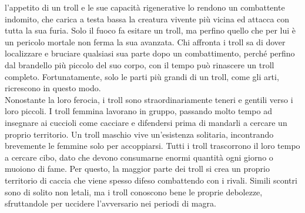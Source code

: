 \begin{multicols}{2}
l'appetito di un troll e le sue capacità rigenerative lo rendono un combattente indomito, che carica a testa bassa la creatura vivente più vicina ed attacca con tutta la sua furia. Solo il fuoco fa esitare un troll, ma perfino quello che per lui è un pericolo mortale non ferma la sua avanzata. Chi affronta i troll sa di dover localizzare e bruciare qualsiasi sua parte dopo un combattimento, perché perfino dal brandello più piccolo del suo corpo, con il tempo può rinascere un troll completo. Fortunatamente, solo le parti più grandi di un troll, come gli arti, ricrescono in questo modo.\\

Nonostante la loro ferocia, i troll sono straordinariamente teneri e gentili verso i loro piccoli. I troll femmina lavorano in gruppo, passando molto tempo ad insegnare ai cuccioli come cacciare e difendersi prima di mandarli a cercare un proprio territorio. Un troll maschio vive un'esistenza solitaria, incontrando brevemente le femmine solo per accoppiarsi. Tutti i troll trascorrono il loro tempo a cercare cibo, dato che devono consumarne enormi quantità ogni giorno o muoiono di fame. Per questo, la maggior parte dei troll si crea un proprio territorio di caccia che viene spesso difeso combattendo con i rivali. Simili scontri sono di solito non letali, ma i troll conoscono bene le proprie debolezze, sfruttandole per uccidere l'avversario nei periodi di magra.\\


\end{multicols}
